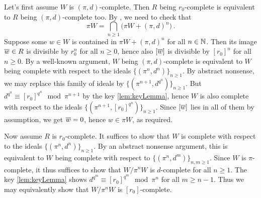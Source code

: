 \documentclass[a4paper, 10pt, oneside, DIV=9, chapterprefix=true, numbers=enddot,bibliography=totoc]{scrbook}
\begin{document}
\begin{proof*}
	Let's first assume $W$ is $(\pi,d)$-complete. Then $R$ being $r_0$-complete is equivalent to $R$ being $(\pi,d)$-complete too. By \cite[]{stacks-project}, we need to check that
	\begin{equation*}
		\pi W=\bigcap_{n\geq 1}\big(\pi W+(\pi,d)^n\big)\,.
	\end{equation*}
	Suppose some $w\in W$ is contained in $\pi W+(\pi,d)^n$ for all $n\in \mathbb{N}$. Then its image $\ov{w}\in R$ is divisible by $r_0^n$ for all $n\geq 0$, hence also $[\ov{w}]$ is divisible by $[r_0]^n$ for all $n\geq 0$. By a well-known argument, $W$ being $(\pi,d)$-complete is equivalent to $W$ being complete with respect to the ideals $\{(\pi^n,d^n)\}_{n\geq 1}$. By abstract nonsense, we may replace this family of ideals by $\{(\pi^{n+1},d^{q^n})\}_{n\geq 1}$. But $d^{q^n}\equiv [r_0]^{q^n}\mod \pi^{n+1}$ by the key \cref{lem:keyLemma}, hence $W$ is also complete with respect to the ideals $\{(\pi^{n+1},[r_0]^{q^n})\}_{n\geq 1}$. Since $[\ov{w}]$ lies in all of them by assumption, we get $\ov{w}=0$, hence $w\in\pi W$, as required.
	
	Now assume $R$ is $r_0$-complete. It suffices to show that $W$ is complete with respect to the ideals $\{(\pi^n,d^n)\}_{n\geq 1}$. By an abstract nonsense argument, this is equivalent to $W$ being complete with respect to $\{(\pi^n,d^m)\}_{n,m\geq 1}$. Since $W$ is $\pi$-complete, it thus suffices to show that $W/\pi^nW$ is $d$-complete for all $n\geq 1$. The key \cref{lem:keyLemma} shows $d^{q^m}\equiv [r_0]^{q^m}\mod \pi^n$ for all $m\geq n-1$. Thus we may equivalently show that $W/\pi^nW$ is $[r_0]$-complete.
	

\end{proof*}
\end{document}
